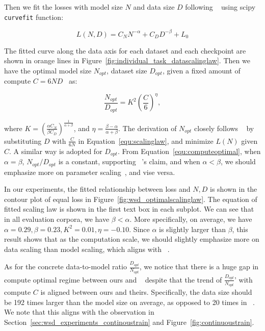 Then we fit the losses with model size $N$ and data size $D$ following ~\cite{hoffmann2022training} using scipy \texttt{curvefit} function:

\begin{equation}
    L(N, D) = C_NN^{-\alpha} + C_DD^{-\beta} + L_0
\label{equ:scalinglaw}
\end{equation}

The fitted curve along the data axis for each dataset and each checkpoint are shown in orange lines in Figure~\ref{fig:individual_task_datascalinglaw}.
Then we have the optimal model size $N_{opt}$, dataset size $D_{opt}$, given a fixed amount of compute $C=6ND$~\citep{rae2021scaling} as: 

\begin{equation}
    \frac{N_{opt}}{D_{opt}} = K^2\left(\frac{C}{6}\right)^{\eta},
\label{equ:computeoptimal}
\end{equation}

where $K = (\frac{\alpha C_N}{\beta C_D})^{\frac{1}{\alpha + \beta}} $, and $\eta=\frac{\beta-\alpha}{\alpha+\beta}$. The derivation of $N_{opt}$ closely follows ~\cite{hoffmann2022training} by substituting $D$ with $\frac{C}{6N}$ in Equation~\ref{equ:scalinglaw}, and minimize $L(N)$ given $C$.  A similar way is adopted for $D_{opt}$. 
From Equation~\ref{equ:computeoptimal}, when $\alpha = \beta$, $N_{opt}/D_{opt}$ is a constant, supporting ~\cite{hoffmann2022training}'s claim, and when $\alpha < \beta$, we should emphasize more on parameter scaling~\citep{kaplan2020scaling}, and vise versa. 

In our experiments, the fitted relationship between loss and $N, D$ is shown in the contour plot of equal loss in Figure~\ref{fig:wsd_optimalscalinglaw}. The equation of fitted scaling law is shown in the first text box in each subplot. We can see that in all evaluation corpora, we have $\beta < \alpha$. More specifically, on average, we have $\alpha=0.29, \beta=0.23, K^2 = 0.01, \eta=-0.10$. Since $\alpha$ is slightly larger than $\beta$, this result shows that as the computation scale, we should slightly emphasize more on data scaling than model scaling, which aligns with ~\cite{hoffmann2022training}.

As for the concrete data-to-model ratio $\frac{D_{opt}}{N_{opt}}$,  we notice that there is a huge gap in compute optimal regime between ours and ~\cite{hoffmann2022training} despite that the trend of $\frac{D_{opt}}{N_{opt}}$' with compute $C$ is aligned between ours and theirs. Specifically, the data size should be 192 times larger than the model size on average, as opposed to 20 times in ~\cite{hoffmann2022training}. We note that this aligns with the observation in Section~\ref{sec:wsd_experiments_continoustrain} and Figure~\ref{fig:continuoustrain}.

